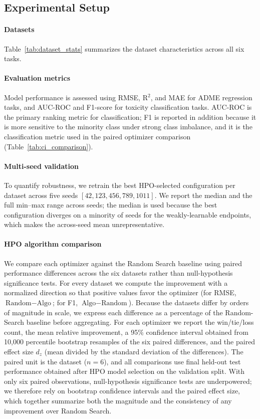 \documentclass[journal]{IEEEtran}
\begin{document}
\subsection{Experimental Setup}
\label{sec:experimental_setup}

\paragraph{Datasets}
Table~\ref{tab:dataset_stats} summarizes the dataset characteristics across all six tasks.

\paragraph{Evaluation metrics}
Model performance is assessed using RMSE, R$^2$, and MAE for ADME regression tasks, and AUC-ROC and F1-score for toxicity classification tasks. AUC-ROC is the primary ranking metric for classification; F1 is reported in addition because it is more sensitive to the minority class under strong class imbalance, and it is the classification metric used in the paired optimizer comparison (Table~\ref{tab:ci_comparison}).

\paragraph{Multi-seed validation}
To quantify robustness, we retrain the best HPO-selected configuration per dataset across five seeds $[42, 123, 456, 789, 1011]$. We report the median and the full min--max range across seeds; the median is used because the best configuration diverges on a minority of seeds for the weakly-learnable endpoints, which makes the across-seed mean unrepresentative.

\paragraph{HPO algorithm comparison}
We compare each optimizer against the Random Search baseline using paired performance differences across the six datasets rather than null-hypothesis significance tests. For every dataset we compute the improvement with a normalized direction so that positive values favor the optimizer (for RMSE, $\text{Random}-\text{Algo}$; for F1, $\text{Algo}-\text{Random}$). Because the datasets differ by orders of magnitude in scale, we express each difference as a percentage of the Random-Search baseline before aggregating. For each optimizer we report the win/tie/loss count, the mean relative improvement, a 95\% confidence interval obtained from 10{,}000 percentile bootstrap resamples of the six paired differences, and the paired effect size $d_z$ (mean divided by the standard deviation of the differences). The paired unit is the dataset ($n=6$), and all comparisons use final held-out test performance obtained after HPO model selection on the validation split. With only six paired observations, null-hypothesis significance tests are underpowered; we therefore rely on bootstrap confidence intervals and the paired effect size, which together summarize both the magnitude and the consistency of any improvement over Random Search.
\end{document}

